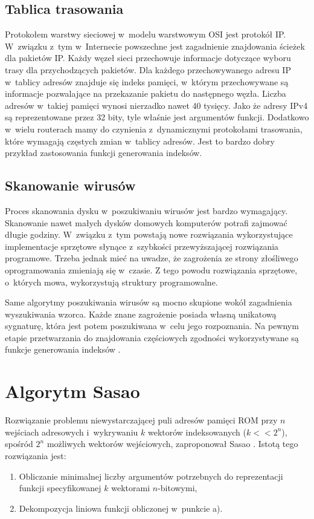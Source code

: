 \subsection{Tablica trasowania}
Protokołem warstwy sieciowej w~modelu warstwowym OSI jest protokół IP.
W~związku z~tym w~Internecie powszechne jest zagadnienie znajdowania ścieżek dla pakietów IP.
Każdy węzeł sieci przechowuje informacje dotyczące wyboru trasy dla przychodzących pakietów.
Dla każdego przechowywanego adresu IP w~tablicy adresów znajduje się indeks pamięci,
w~którym przechowywane są informacje pozwalające na przekazanie pakietu do następnego węzła.
Liczba adresów w~takiej pamięci wynosi nierzadko nawet 40 tysięcy.
Jako że adresy IPv4 są reprezentowane przez 32 bity, tyle właśnie jest argumentów funkcji.
Dodatkowo w~wielu routerach mamy do czynienia z~dynamicznymi protokołami trasowania,
które wymagają częstych zmian w~tablicy adresów.
Jest to bardzo dobry przykład zastosowania funkcji generowania indeksów.

\subsection{Skanowanie wirusów}
Proces skanowania dysku w~poszukiwaniu wirusów jest bardzo wymagający.
Skanowanie nawet małych dysków domowych komputerów potrafi zajmować długie godziny.
W~związku z~tym powstają nowe rozwiązania wykorzystujące implementacje sprzętowe słynące z~szybkości przewyższającej rozwiązania programowe.
Trzeba jednak mieć na uwadze, że zagrożenia ze strony złośliwego oprogramowania zmieniają się w~czasie.
Z tego powodu rozwiązania sprzętowe, o~których mowa, wykorzystują struktury programowalne.

Same algorytmy poszukiwania wirusów są mocno skupione wokół zagadnienia wyszukiwania wzorca.
Każde znane zagrożenie posiada własną unikatową sygnaturę,
która jest potem poszukiwana w~celu jego rozpoznania.
Na pewnym etapie przetwarzania do znajdowania częściowych zgodności wykorzystywane są funkcje generowania indeksów \cite{wirusy}.

\section{Algorytm Sasao}
Rozwiązanie problemu niewystarczającej puli adresów pamięci ROM przy $n$ wejściach adresowych i~wykrywaniu $k$ wektorów indeksowanych ($k<<2^n$),
spośród $2^n$ możliwych wektorów wejściowych,
zaproponował Sasao \cite{sasao-workshop, sasao-recent, sasao-s-min, sasao-synthesis}.
Istotą tego rozwiązania jest:
\begin{enumerate}[label=\alph*)]
\item Obliczanie minimalnej liczby argumentów potrzebnych do reprezentacji funkcji specyfikowanej $k$ wektorami $n$-bitowymi,
\item Dekompozycja liniowa funkcji obliczonej w~punkcie a).
\end{enumerate}

